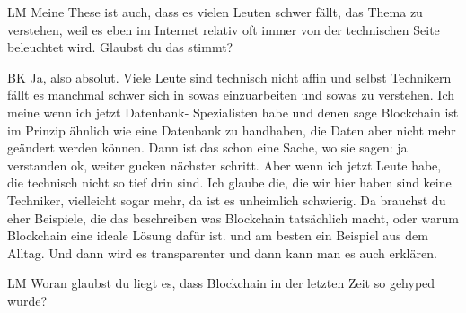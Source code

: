 \begin{xlist}
    \item[LM] Meine These ist auch, dass es vielen Leuten schwer fällt, das Thema zu verstehen, weil es eben im Internet relativ oft immer von der technischen Seite beleuchtet wird. Glaubst du das stimmt? \item[BK] Ja, also absolut. Viele Leute sind technisch nicht affin und selbst Technikern fällt es manchmal schwer sich in sowas einzuarbeiten und sowas zu verstehen. Ich meine wenn ich jetzt Datenbank- Spezialisten habe und denen sage Blockchain ist im Prinzip ähnlich wie eine Datenbank zu handhaben, die Daten aber nicht mehr geändert werden können. Dann ist das schon eine Sache, wo sie sagen: ja verstanden ok, weiter gucken nächster schritt. Aber wenn ich jetzt Leute habe, die technisch nicht so tief drin sind. Ich glaube die, die wir hier haben sind keine Techniker, vielleicht sogar mehr, da ist es unheimlich schwierig. Da brauchst du eher Beispiele, die das beschreiben was Blockchain tatsächlich macht, oder warum Blockchain eine ideale Lösung dafür ist. und am besten ein Beispiel aus dem Alltag. Und dann wird es transparenter und dann kann man es auch erklären.
    \item[LM] Woran glaubst du liegt es, dass Blockchain in der letzten Zeit so gehyped wurde?

\end{xlist}
